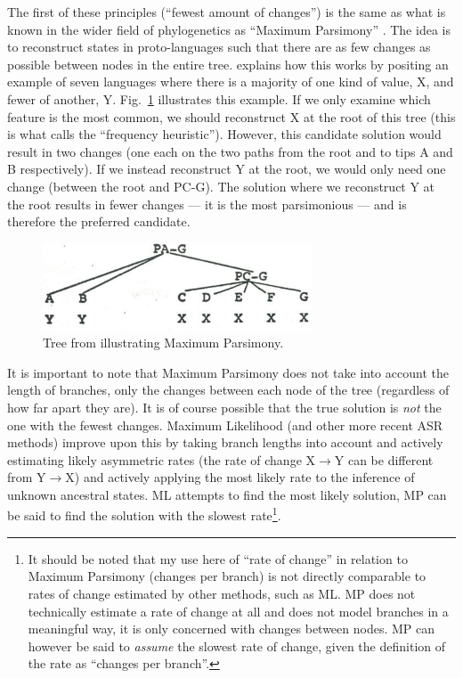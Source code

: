 \documentclass[12pt,letterpaper]{article}
\begin{document}
The first of these principles (``fewest amount of changes'') is the same as what is known in the wider field of phylogenetics as ``Maximum Parsimony'' \citep{felsenstein2004inferring}. The idea is to reconstruct states in proto-languages such that there are as few changes as possible between nodes in the entire tree. \citet[17-22]{clark1973aspects} explains how this works by positing an example of seven languages where there is a majority of one kind of value, X, and fewer of another, Y. Fig.~\ref{fig:clark_tree} illustrates this example. If we only examine which feature is the most common, we should reconstruct X at the root of this tree (this is what \cite{goldstein_2022} calls the ``frequency heuristic''). However, this candidate solution would result in two changes (one each on the two paths from the root and to tips A and B respectively). If we instead reconstruct Y at the root, we would only need one change (between the root and PC-G). The solution where we reconstruct Y at the root results in fewer changes --- it is the most parsimonious --- and is therefore the preferred candidate.
 
\begin{figure}[ht]
\centering
\includegraphics[width=8cm]{illustrations/Clark_1977_tree.png}
\caption{{Tree from \citet[19]{clark1973aspects} illustrating Maximum Parsimony.}}
\label{fig:clark_tree}
\end{figure}

It is important to note that Maximum Parsimony does not take into account the length of branches, only the changes between each node of the tree (regardless of how far apart they are). It is of course possible that the true solution is \textit{not} the one with the fewest changes. Maximum Likelihood (and other more recent ASR methods) improve upon this by taking branch lengths into account and actively estimating likely asymmetric rates (the rate of change X$\rightarrow$Y can be different from Y$\rightarrow$X) and actively applying the most likely rate to the inference of unknown ancestral states. ML attempts to find the most likely solution, MP can be said to find the solution with the slowest rate\footnote{It should be noted that my use here of ``rate of change'' in relation to Maximum Parsimony (changes per branch) is not directly comparable to rates of change estimated by other methods, such as ML. MP does not technically estimate a rate of change at all and does not model branches in a meaningful way, it is only concerned with changes between nodes. MP can however be said to \emph{assume} the slowest rate of change, given the definition of the rate as ``changes per branch''.}.
\end{document}
